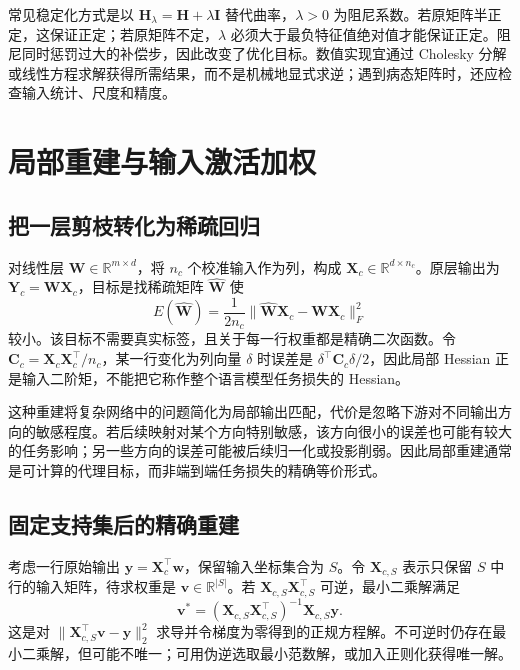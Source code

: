 \documentclass[UTF8,12pt,a4paper,fontset=fandol]{ctexart}
\begin{document}
常见稳定化方式是以 $\mathbf H_\lambda=\mathbf H+\lambda\mathbf I$ 替代曲率，$\lambda>0$ 为阻尼系数。若原矩阵半正定，这保证正定；若原矩阵不定，$\lambda$ 必须大于最负特征值绝对值才能保证正定。阻尼同时惩罚过大的补偿步，因此改变了优化目标。数值实现宜通过 Cholesky 分解或线性方程求解获得所需结果，而不是机械地显式求逆；遇到病态矩阵时，还应检查输入统计、尺度和精度。

\section{局部重建与输入激活加权}
\label{sec:prune-reconstruction}

\subsection{把一层剪枝转化为稀疏回归}
对线性层 $\mathbf W\in\mathbb R^{m\times d}$，将 $n_c$ 个校准输入作为列，构成 $\mathbf X_c\in\mathbb R^{d\times n_c}$。原层输出为 $\mathbf Y_c=\mathbf W\mathbf X_c$，目标是找稀疏矩阵 $\widehat{\mathbf W}$ 使
\begin{equation}
 E(\widehat{\mathbf W})=\frac{1}{2n_c}
 \|\widehat{\mathbf W}\mathbf X_c-\mathbf W\mathbf X_c\|_F^2
 \label{eq:prune-reconstruct}
\end{equation}
较小。该目标不需要真实标签，且关于每一行权重都是精确二次函数。令 $\mathbf C_c=\mathbf X_c\mathbf X_c^\top/n_c$，某一行变化为列向量 $\delta$ 时误差是 $\delta^\top\mathbf C_c\delta/2$，因此局部 Hessian 正是输入二阶矩，不能把它称作整个语言模型任务损失的 Hessian。

这种重建将复杂网络中的问题简化为局部输出匹配，代价是忽略下游对不同输出方向的敏感程度。若后续映射对某个方向特别敏感，该方向很小的误差也可能有较大的任务影响；另一些方向的误差可能被后续归一化或投影削弱。因此局部重建通常是可计算的代理目标，而非端到端任务损失的精确等价形式。

\subsection{固定支持集后的精确重建}
考虑一行原始输出 $\mathbf y=\mathbf X_c^\top\mathbf w$，保留输入坐标集合为 $S$。令 $\mathbf X_{c,S}$ 表示只保留 $S$ 中行的输入矩阵，待求权重是 $\mathbf v\in\mathbb R^{|S|}$。若 $\mathbf X_{c,S}\mathbf X_{c,S}^\top$ 可逆，最小二乘解满足
\begin{equation}
 \mathbf v^*=(\mathbf X_{c,S}\mathbf X_{c,S}^\top)^{-1}
 \mathbf X_{c,S}\mathbf y.
 \label{eq:prune-least-squares}
\end{equation}
这是对 $\|\mathbf X_{c,S}^\top\mathbf v-\mathbf y\|_2^2$ 求导并令梯度为零得到的正规方程解。不可逆时仍存在最小二乘解，但可能不唯一；可用伪逆选取最小范数解，或加入正则化获得唯一解。
\end{document}
